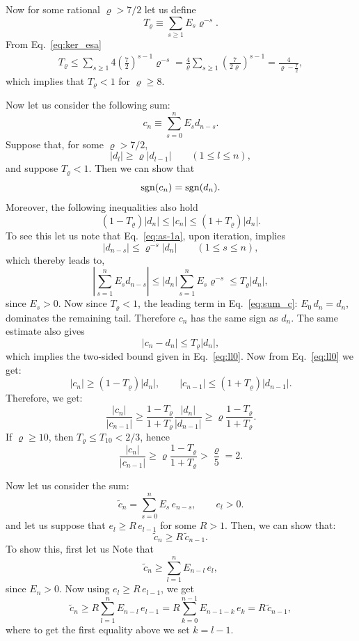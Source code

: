 \documentclass[11pt]{article}
\newcommand\be{\begin{equation}}
\newcommand\ee{\end{equation}}
\begin{document}
Now for some rational \(\varrho>7/2\) let us define
\be\label{eq:I_rho}
        T_\varrho \equiv \sum_{s\ge1}E_s\varrho^{-s}.
\ee
From Eq.~\eqref{eq:ker_esa}
\begin{equation}
\begin{aligned}
T_\varrho
\le
\sum_{s\ge1}
4\left(\frac72\right)^{s-1}\varrho^{-s}
=
\frac{4}{\varrho}
\sum_{s\ge1}
\left(\frac{7}{2\varrho}\right)^{s-1}
=
\frac{4}{\varrho-\frac72},
\end{aligned}
\label{eq:T-rho-bound}
\end{equation}
which implies that $T_\varrho<1$ for $\varrho\geq 8$.

Now let us consider the following sum:
\be\label{eq:sum_c}
        c_n\equiv\sum_{s=0}^{n}E_sd_{n-s}.
\ee
Suppose that, for some \(\varrho>7/2\),
\be\label{eq:as-1a}
        |d_l|\ge \varrho |d_{l-1}|
        \qquad(1\le l\le n),
\ee
and suppose \(T_\varrho<1\). Then we can show that
\be\label{eq:c=d}
        {\rm{sgn}}(c_n)={\rm{sgn}}(d_n).
\ee
Moreover, the following inequalities also hold
\be\label{eq:ll0}
        (1-T_\varrho)|d_n|
        \le
        |c_n|
        \le
        (1+T_\varrho)|d_n|.
\ee
To see this let us note that Eq.~\eqref{eq:as-1a}, upon iteration, implies
\[
        |d_{n-s}|\le \varrho^{-s}|d_n|
        \qquad(1\le s\le n),
\]
which thereby leads to,
\be\label{eq:lemma1}
\left|
\sum_{s=1}^{n}E_sd_{n-s}
\right|
\le
|d_n|
\sum_{s=1}^{n}E_s\varrho^{-s}
\le
T_\varrho |d_n|,
\ee
since $E_s>0$. Now since \(T_\varrho<1\), the leading term in Eq.~\eqref{eq:sum_c}: \(E_0\,d_n=d_n\), dominates the remaining tail. Therefore \(c_n\) has the same sign as \(d_n\). The same estimate also gives
\[
        |c_n-d_n|\le T_\varrho |d_n|,
\]
which implies the two-sided bound given in Eq.~\eqref{eq:ll0}. Now from Eq.~\eqref{eq:ll0} we get:
\[
        |c_n|\ge (1-T_\varrho)|d_n|,
        \qquad
        |c_{n-1}|\le (1+T_\varrho)|d_{n-1}|.
\]
Therefore, we get:
\be\label{eq:rat_cn}
        \frac{|c_n|}{|c_{n-1}|}
        \ge
        \frac{1-T_\varrho}{1+T_\varrho}
        \frac{|d_n|}{|d_{n-1}|}
        \ge
        \varrho\frac{1-T_\varrho}{1+T_\varrho}.
\ee
If \(\varrho\ge10\), then \(T_\varrho\le T_{10}<2/3\), hence
\be\label{eq:rat_cn2}
        \frac{|c_n|}{|c_{n-1}|}\ge \varrho\frac{1-T_\varrho}{1+T_\varrho}
        >
        \frac{\varrho}{5} = 2.
\ee

Now let us consider the sum:
\[
        \tilde{c}_n = \sum_{s=0}^{n}E_s\,e_{n-s},
        \qquad
        e_l>0.
\]
and let us suppose that $e_l\ge R\, e_{l-1}$ for some \(R>1\). Then, we can show that:
\be\label{eq:tilc}
        \tilde{c}_n\ge R \, \tilde{c}_{n-1}.
\ee
To show this, first let us Note that
\[
        \tilde{c}_n
        \ge
        \sum_{l=1}^{n}E_{n-l}\,e_l,
\]
since $E_n>0$. Now using \(e_l\ge R\, e_{l-1}\), we get
\[
        \tilde{c}_n
        \ge
        R\sum_{l=1}^{n}E_{n-l}\,e_{l-1}=R\sum_{k=0}^{n-1}E_{n-1-k}\,e_k
        =
        R\,\tilde{c}_{n-1},
\]
where to get the first equality above we set $k=l-1$.
\end{document}
